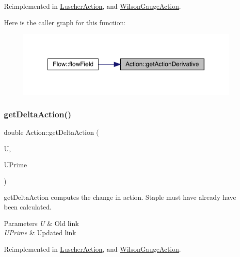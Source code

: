 Reimplemented in \mbox{\hyperlink{class_luscher_action_ac11785b2df276816a098a87e6ac514c7}{Luscher\+Action}}, and \mbox{\hyperlink{class_wilson_gauge_action_a43cf939cd53495b7225fbeaa8a0ff6e8}{Wilson\+Gauge\+Action}}.

Here is the caller graph for this function\+:
\nopagebreak
\begin{figure}[H]
\begin{center}
\leavevmode
\includegraphics[width=334pt]{class_action_a78168dd7c3819a3365e28fc1aae1b9b6_icgraph}
\end{center}
\end{figure}
\mbox{\label{class_action_a9409aad86cbfe3b6ec25bf5a837eaea5}} 
\subsubsection{\texorpdfstring{getDeltaAction()}{getDeltaAction()}}
{\footnotesize\ttfamily double Action\+::get\+Delta\+Action (\begin{DoxyParamCaption}\item[{\mbox{\hyperlink{class_s_u3}{S\+U3}}}]{U,  }\item[{\mbox{\hyperlink{class_s_u3}{S\+U3}}}]{U\+Prime }\end{DoxyParamCaption})\hspace{0.3cm}{\ttfamily [virtual]}}



get\+Delta\+Action computes the change in action. Staple must have already have been calculated. 


\begin{DoxyParams}{Parameters}
{\em U} & Old link \\
\hline
{\em U\+Prime} & Updated link \\
\hline
\end{DoxyParams}


Reimplemented in \mbox{\hyperlink{class_luscher_action_a1955f8eea8b0771f6c737c39e3fc11b2}{Luscher\+Action}}, and \mbox{\hyperlink{class_wilson_gauge_action_a60f2892e61489004df3cde6cc856b00b}{Wilson\+Gauge\+Action}}.



